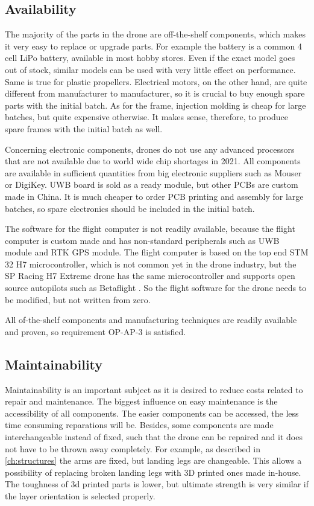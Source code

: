 \subsection{Availability} %
The majority of the parts in the drone are off-the-shelf components, which makes it very easy to replace or upgrade parts. For example the battery is a common 4 cell LiPo battery, available in most hobby stores. Even if the exact model goes out of stock, similar models can be used with very little effect on performance. Same is true for plastic propellers. Electrical motors, on the other hand, are quite different from manufacturer to manufacturer, so it is crucial to buy enough spare parts with the initial batch. As for the frame, injection molding is cheap for large batches, but quite expensive otherwise. It makes sense, therefore, to produce spare frames with the initial batch as well. 

Concerning electronic components, drones do not use any advanced processors that are not available due to world wide chip shortages in 2021. All components are available in sufficient quantities from big electronic suppliers such as Mouser or DigiKey. UWB board is sold as a ready module, but other PCBs are custom made in China. It is much cheaper to order PCB printing and assembly for large batches, so spare electronics should be included in the initial batch. 

The software for the flight computer is not readily available, because the flight computer is custom made and has non-standard peripherals such as UWB module and RTK GPS module. The flight computer is based on the top end STM 32 H7 microcontroller, which is not common yet in the drone industry, but the SP Racing H7 Extreme drone has the same microcontroller and supports open source autopilots such as Betaflight \cite{H7_flight_computer} \cite{Betaflight}. So the flight software for the drone needs to be modified, but not written from zero. 

All of-the-shelf components and manufacturing techniques are readily available and proven, so requirement OP-AP-3 is satisfied. 



    

\subsection{Maintainability}%
\label{RAMS_maintainability}
Maintainability is an important subject as it is desired to reduce costs related to repair and maintenance. The biggest influence on easy maintenance is the accessibility of all components. The easier components can be accessed, the less time consuming reparations will be. Besides, some components are made interchangeable instead of fixed, such that the drone can be repaired and it does not have to be thrown away completely. For example, as described in \autoref{ch:structures} the arms are fixed, but landing legs are changeable. This allows a possibility of replacing broken landing legs with 3D printed ones made in-house. The toughness of 3d printed parts is lower, but ultimate strength is very similar if the layer orientation is selected properly. 

